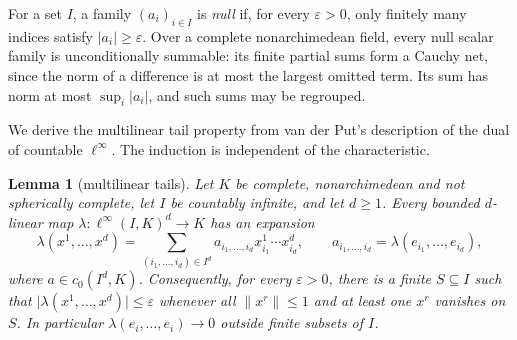 \documentclass[11pt]{amsart}
\newtheorem{lemma}[theorem]{Lemma}
\theoremstyle{definition}
\theoremstyle{remark}
\numberwithin{equation}{section}
\newcommand{\linf}{\ell^\infty}
\newcommand{\abs}[1]{\lvert #1\rvert}
\newcommand{\norm}[1]{\lVert #1\rVert}
\theoremstyle{plain}
\theoremstyle{definition}
\theoremstyle{plain}
\begin{document}
For a set $I$, a family $(a_i)_{i\in I}$ is \emph{null} if, for every $\varepsilon>0$, only finitely many
indices satisfy $\abs{a_i}\ge\varepsilon$. Over a complete nonarchimedean field, every null scalar family
is unconditionally summable: its finite partial sums form a Cauchy net, since the norm of a difference is
at most the largest omitted term. Its sum has norm at most $\sup_i\abs{a_i}$, and such sums may be regrouped.

We derive the multilinear tail property from van der Put's description of the dual of countable $\linf$. The induction is independent of the characteristic.

\begin{lemma}[multilinear tails]\label{scalar:tail}
Let $K$ be complete, nonarchimedean and not spherically complete, let $I$ be countably infinite, and let
$d\ge1$. Every bounded $d$\nobreakdash-linear map $\lambda\colon\linf(I,K)^d\to K$ has an expansion
\begin{equation}\label{scalar:array}
 \lambda(x^1,\dots,x^d)
 =\sum_{(i_1,\dots,i_d)\in I^d}a_{i_1,\dots,i_d}x^1_{i_1}\cdots x^d_{i_d},
 \qquad a_{i_1,\dots,i_d}=\lambda(e_{i_1},\dots,e_{i_d}),
\end{equation}
where $a\in c_0(I^d,K)$. Consequently, for every $\varepsilon>0$, there is a finite $S\subseteq I$ such that
$\abs{\lambda(x^1,\dots,x^d)}\le\varepsilon$ whenever all $\norm{x^r}\le1$ and at least one $x^r$ vanishes
on $S$. In particular $\lambda(e_i,\dots,e_i)\to0$ outside finite subsets of $I$.
\end{lemma}
\end{document}
